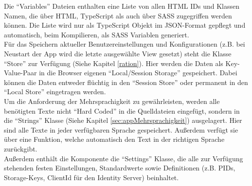 Die \enquote{Variables} Dateien enthalten eine Liste von allen HTML IDs und Klassen Namen, die über HTML, TypeScript als auch über SASS zugegriffen werden können. Die Liste wird nur als TypeScript Objekt im JSON-Format gepflegt und automatisch, beim Kompilieren, als SASS Variablen generiert.
\\
Für das Speichern aktueller Benutzereinstellungen und Konfigurationen (z.B. bei Neustart der App wird die letzte ausgewählte View gesetzt) steht die Klasse \enquote{Store} zur Verfügung (Siehe Kapitel \ref{ration}). Hier werden die Daten als Key-Value-Paar in die Browser eigenen \enquote{Local/Session Storage} gespeichert. Dabei können die Daten entweder flüchtig in den \enquote{Session Store} oder permanent in den \enquote{Local Store} eingetragen werden. 
\\
Um die Anforderung der Mehrsprachigkeit zu gewährleisten, werden alle benötigten Texte nicht \enquote{Hard Coded} in die Quelldateien eingefügt, sondern in die \enquote{Strings} Klasse (Siehe Kapitel \ref{sec:appMehrsprachigkeit}) ausgelagert. Hier sind alle Texte in jeder verfügbaren Sprache gespeichert. Außerdem verfügt sie über eine Funktion, welche automatisch den Text in der richtigen Sprache zurückgibt.
\\
Außerdem enthält die Komponente die \enquote{Settings} Klasse, die alle zur Verfügung stehenden festen Einstellungen, Standardwerte sowie Definitionen (z.B. PIDs, Storage-Keys, ClientId für den Identity Server) beinhaltet.

\paragraph{}

